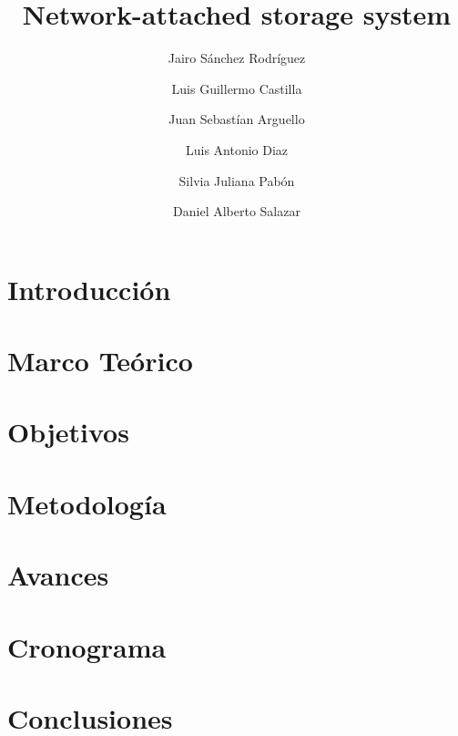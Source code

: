 \documentclass[runningheads]{llncs}
\begin{document}
%
\title{Network-attached storage system}
%
%
\author{Jairo Sánchez Rodríguez \and
Luis Guillermo Castilla\and
Juan Sebastían Arguello\and
Luis Antonio Diaz\and
Silvia Juliana Pabón\and
Daniel Alberto Salazar}
%
%
%
\maketitle              
%

%
\section{Introducción}

%
\section{Marco Teórico}

%
\section{Objetivos}

%
\section{Metodología}

%
\section{Avances}

%
\section{Cronograma}

%
\section{Conclusiones}

%
\end{document}
